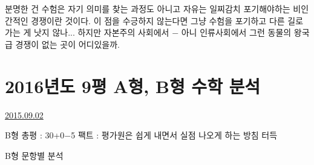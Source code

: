 분명한 건 수험은 자기 의미를 찾는 과정도 아니고 자유는 일찌감치 포기해야하는 비인간적인 경쟁이란 것이다.
이 점을 수긍하지 않는다면 그냥 수험을 포기하고 다른 길로 가는 게 낫지 않나... 하지만
자본주의 사회에서 $-$ 아니 인류사회에서 그런 동물의 왕국급 경쟁이 없는 곳이 어디있을까.
\vspace{5mm}






\section{2016년도 9평 A형, B형 수학 분석}
\href{https://www.kockoc.com/Apoc/285090}{2015.09.02}

\vspace{5mm}

B형 총평 : 30+0$-$5
팩트 : 평가원은 쉽게 내면서 실점 나오게 하는 방침 터득
\vspace{5mm}

B형 문항별 분석
\vspace{5mm}

